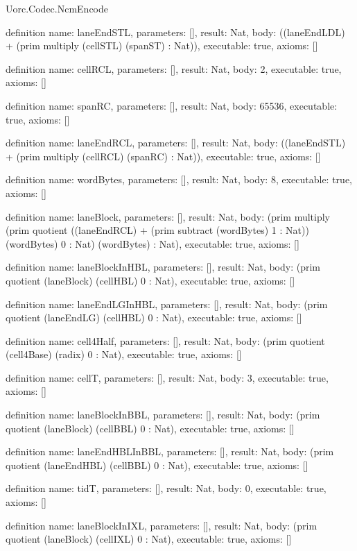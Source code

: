 \begin{lexlean}{Uorc.Codec.NcmEncode}
\begin{semanticmodule}
definition{
  name: laneEndSTL,
  parameters: [],
  result: Nat,
  body: ((laneEndLDL) + (prim multiply (cellSTL) (spanST) : Nat)),
  executable: true,
  axioms: []
}

definition{
  name: cellRCL,
  parameters: [],
  result: Nat,
  body: 2,
  executable: true,
  axioms: []
}

definition{
  name: spanRC,
  parameters: [],
  result: Nat,
  body: 65536,
  executable: true,
  axioms: []
}

definition{
  name: laneEndRCL,
  parameters: [],
  result: Nat,
  body: ((laneEndSTL) + (prim multiply (cellRCL) (spanRC) : Nat)),
  executable: true,
  axioms: []
}

definition{
  name: wordBytes,
  parameters: [],
  result: Nat,
  body: 8,
  executable: true,
  axioms: []
}

definition{
  name: laneBlock,
  parameters: [],
  result: Nat,
  body: (prim multiply (prim quotient ((laneEndRCL) + (prim subtract (wordBytes) 1 : Nat)) (wordBytes) 0 : Nat) (wordBytes) : Nat),
  executable: true,
  axioms: []
}

definition{
  name: laneBlockInHBL,
  parameters: [],
  result: Nat,
  body: (prim quotient (laneBlock) (cellHBL) 0 : Nat),
  executable: true,
  axioms: []
}

definition{
  name: laneEndLGInHBL,
  parameters: [],
  result: Nat,
  body: (prim quotient (laneEndLG) (cellHBL) 0 : Nat),
  executable: true,
  axioms: []
}

definition{
  name: cell4Half,
  parameters: [],
  result: Nat,
  body: (prim quotient (cell4Base) (radix) 0 : Nat),
  executable: true,
  axioms: []
}

definition{
  name: cellT,
  parameters: [],
  result: Nat,
  body: 3,
  executable: true,
  axioms: []
}

definition{
  name: laneBlockInBBL,
  parameters: [],
  result: Nat,
  body: (prim quotient (laneBlock) (cellBBL) 0 : Nat),
  executable: true,
  axioms: []
}

definition{
  name: laneEndHBLInBBL,
  parameters: [],
  result: Nat,
  body: (prim quotient (laneEndHBL) (cellBBL) 0 : Nat),
  executable: true,
  axioms: []
}

definition{
  name: tidT,
  parameters: [],
  result: Nat,
  body: 0,
  executable: true,
  axioms: []
}

definition{
  name: laneBlockInIXL,
  parameters: [],
  result: Nat,
  body: (prim quotient (laneBlock) (cellIXL) 0 : Nat),
  executable: true,
  axioms: []
}


\end{semanticmodule}
\end{lexlean}
